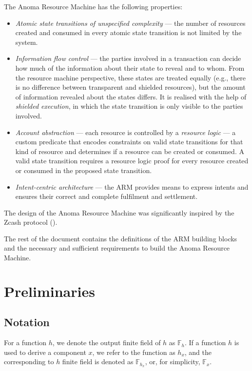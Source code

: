The Anoma Resource Machine has the following properties:
\begin{itemize}
    \item \textit{Atomic state transitions of unspecified complexity} — the number of resources created and consumed in every atomic state transition is not limited by the system.
    \item \textit{Information flow control} — the parties involved in a transaction can decide how much of the information about their state to reveal and to whom. From the resource machine perspective, these states are treated equally (e.g., there is no difference between transparent and shielded resources), but the amount of information revealed about the states differs. It is realised with the help of \textit{shielded execution}, in which the state transition is only visible to the parties involved.
    \item \textit{Account abstraction} — each resource is controlled by a \textit{resource logic} — a custom predicate that encodes constraints on valid state transitions for that kind of resource and determines if a resource can be created or consumed. A valid state transition requires a resource logic proof for every resource created or consumed in the proposed state transition.
    \item \textit{Intent-centric architecture} — the ARM provides means to express intents and ensures their correct and complete fulfilment and settlement.
\end{itemize} 

The design of the Anoma Resource Machine was significantly inspired by the Zcash protocol (\cite{orchard}).

The rest of the document contains the definitions of the ARM building blocks and the necessary and sufficient requirements to build the Anoma Resource Machine. %

\section{Preliminaries}

\subsection{Notation}

For a function $h$, we denote the output finite field of $h$ as $\mathbb{F}_h$. If a function $h$ is used to derive a component $x$, we refer to the function as $h_x$, and the corresponding to $h$ finite field is denoted as $\mathbb{F}_{h_x}$, or, for simplicity, $\mathbb{F}_x$.

